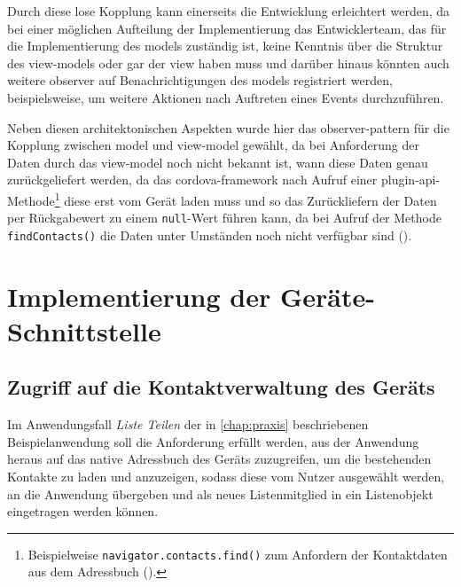 Durch diese lose Kopplung kann einerseits die Entwicklung erleichtert werden, da bei einer möglichen Aufteilung der Implementierung das Entwicklerteam, das für die Implementierung des \glspl{model} zuständig ist, keine Kenntnis über die Struktur des \glspl{view-model} oder gar der \gls{view} haben muss und darüber hinaus könnten auch weitere \gls{observer} auf Benachrichtigungen des \glspl{model} registriert werden, beispielsweise, um weitere Aktionen nach Auftreten eines Events durchzuführen.

Neben diesen architektonischen Aspekten wurde hier das \gls{observer-pattern} für die Kopplung zwischen \gls{model} und \gls{view-model} gewählt, da bei Anforderung der Daten durch das \gls{view-model} noch nicht bekannt ist, wann diese Daten genau zurückgeliefert werden, da das \gls{cordova}-\gls{framework} nach Aufruf einer \gls{plugin}-\gls{api}-Methode\footnote{Beispielweise \lstinline|navigator.contacts.find()| zum Anfordern der Kontaktdaten aus dem Adressbuch ().} diese erst vom Gerät laden muss und so das Zurückliefern der Daten per Rückgabewert zu einem \lstinline|null|-Wert führen kann, da bei Aufruf der Methode \lstinline|findContacts()| die Daten unter Umständen noch nicht verfügbar sind ().




\section{Implementierung der Geräte-Schnittstelle}

		
\subsection{Zugriff auf die Kontaktverwaltung des Geräts} \label{sec:contacts}

Im Anwendungsfall \emph{Liste Teilen} der in \autoref{chap:praxis} beschriebenen Beispielanwendung  soll die Anforderung erfüllt werden, aus der Anwendung heraus auf das native Adressbuch des Geräts zuzugreifen, um die bestehenden Kontakte zu laden und anzuzeigen, sodass diese vom Nutzer ausgewählt werden, an die Anwendung übergeben und als neues Listenmitglied in ein Listenobjekt eingetragen werden können.

